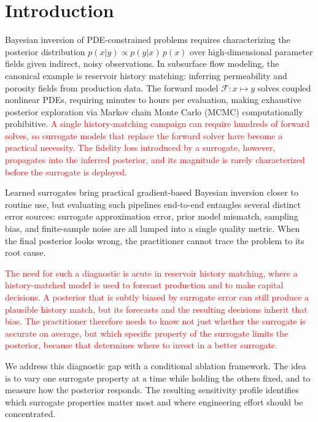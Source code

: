 \documentclass[12pt]{article}
\newcommand{\add}[1]{\textcolor{red}{#1}}
\begin{document}
\section{Introduction}

Bayesian inversion of PDE-constrained problems requires characterizing the posterior distribution $p(x|y)\propto p(y|x)\,p(x)$ over high-dimensional parameter fields given indirect, noisy observations. In subsurface flow modeling, the canonical example is reservoir history matching: inferring permeability and porosity fields from production data. The forward model $\mathcal{F}:x\mapsto y$ solves coupled nonlinear PDEs, requiring minutes to hours per evaluation, making exhaustive posterior exploration via Markov chain Monte Carlo (MCMC) computationally prohibitive. \add{A single history-matching campaign can require hundreds of forward solves, so surrogate models that replace the forward solver have become a practical necessity. The fidelity loss introduced by a surrogate, however, propagates into the inferred posterior, and its magnitude is rarely characterized before the surrogate is deployed.}

Learned surrogates bring practical gradient-based Bayesian inversion closer to routine use, but evaluating such pipelines end-to-end entangles several distinct error sources: surrogate approximation error, prior model mismatch, sampling bias, and finite-sample noise are all lumped into a single quality metric. When the final posterior looks wrong, the practitioner cannot trace the problem to its root cause.

\add{The need for such a diagnostic is acute in reservoir history matching, where a history-matched model is used to forecast production and to make capital decisions. A posterior that is subtly biased by surrogate error can still produce a plausible history match, but its forecasts and the resulting decisions inherit that bias. The practitioner therefore needs to know not just whether the surrogate is accurate on average, but which specific property of the surrogate limits the posterior, because that determines where to invest in a better surrogate.}

We address this diagnostic gap with a conditional ablation framework. The idea is to vary one surrogate property at a time while holding the others fixed, and to measure how the posterior responds. The resulting sensitivity profile identifies which surrogate properties matter most and where engineering effort should be concentrated.
\end{document}

